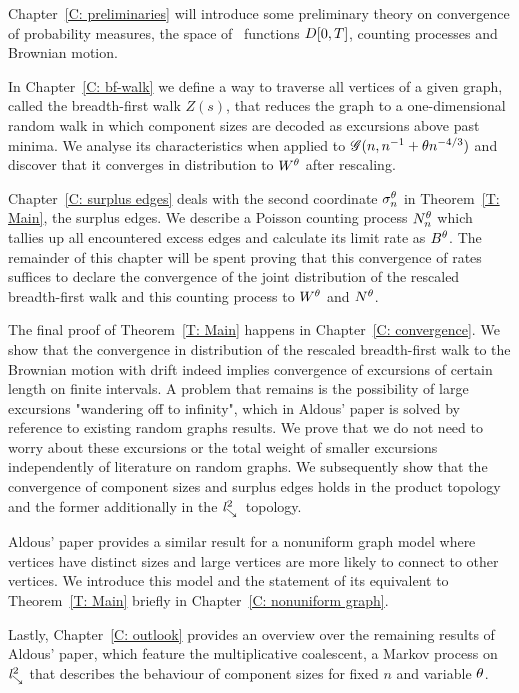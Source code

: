 Chapter~\ref{C: preliminaries} will introduce some preliminary theory on convergence of probability measures,
the space of \cadlag~functions $D[0, T]$, counting processes and Brownian motion.

In Chapter~\ref{C: bf-walk} we define a way to traverse all vertices of a given graph, called the breadth-first walk $Z(s)$, 
that reduces the graph to a one-dimensional random walk in which component sizes are decoded as excursions above past minima.
We analyse its characteristics when applied to $\mathscr{G}(n, n^{-1} + \theta n^{-4/3})$ and discover that it converges in distribution to $W^{\theta}$ after rescaling.

Chapter~\ref{C: surplus edges} deals with the second coordinate $\mathcal{\sigma}^{\theta}_n$ in Theorem~\ref{T: Main}, the surplus edges.
We describe a Poisson counting process $N_n^{\theta}$ which tallies up all encountered excess edges and calculate its limit rate as $B^{\theta}$.
The remainder of this chapter will be spent proving that this convergence of rates suffices to declare the convergence of the joint distribution of
the rescaled breadth-first walk and this counting process to $W^{\theta}$ and $N^{\theta}$.

The final proof of Theorem~\ref{T: Main} happens in Chapter~\ref{C: convergence}.
We show that the convergence in distribution of the rescaled breadth-first walk to the Brownian motion with drift
indeed implies convergence of excursions of certain length on finite intervals.
A problem that remains is the possibility of large excursions "wandering off to infinity", 
which in Aldous' paper is solved by reference to existing random graphs results.
We prove that we do not need to worry about these excursions or the total weight of smaller excursions
independently of literature on random graphs. 
We subsequently show that the convergence of component sizes and surplus edges holds in the product topology 
and the former additionally in the $\mathit{l}^2_{\searrow}$~topology.

Aldous' paper provides a similar result for a nonuniform graph model where vertices have distinct sizes
and large vertices are more likely to connect to other vertices.
We introduce this model and the statement of its equivalent to Theorem~\ref{T: Main} briefly in Chapter~\ref{C: nonuniform graph}.

Lastly, Chapter~\ref{C: outlook} provides an overview over the remaining results of Aldous' paper,
which feature the multiplicative coalescent, a Markov process on $\mathit{l}^2_{\searrow}$ that describes the behaviour of component sizes for fixed $n$ and variable $\theta$.

